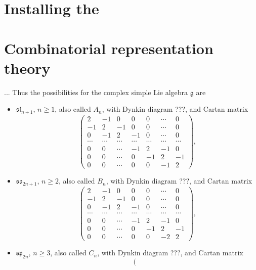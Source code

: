  


\section{Installing the \pkg}

\section{Combinatorial representation theory}
... Thus the possibilities for the complex simple Lie algebra
$\mathfrak{g}$ are
\begin{itemize}
\item $\mathfrak{sl}_{n+1}$, $n \geq 1$, also called $A_n$, with Dynkin diagram
???, and Cartan matrix $$\left(
\begin{array}{rrrrrrr}
 2 & -1 & 0 & 0 & 0 &\cdots & 0 \\
 -1 & 2 & -1 & 0 & 0 &\cdots & 0 \\
 0 & -1 & 2 & -1 & 0 & \cdots & 0 \\
 \cdots & \cdots & \cdots & \cdots & \cdots & \cdots & \cdots \\
 0 & 0& \cdots & -1 & 2 & -1 & 0 \\
 0 & 0 &\cdots & 0 & -1 & 2 & -1 \\
 0 & 0 &\cdots & 0 & 0 & -1 & 2
\end{array}
\right),$$
\item $\mathfrak{so}_{2n+1}$, $n \geq 2$, also called $B_n$, with Dynkin diagram
???, and Cartan matrix
$$\left(
\begin{array}{rrrrrrr}
 2 & -1 & 0 & 0 & 0 & \cdots & 0 \\
 -1 & 2 & -1 & 0 & 0 & \cdots & 0 \\
 0 & -1 & 2 & -1 & 0 & \cdots &0 \\
 \cdots & \cdots & \cdots & \cdots & \cdots & \cdots & \cdots \\
 0 & 0 &\cdots & -1 & 2 & -1 & 0 \\
 0 & 0 &\cdots & 0 & -1 & 2 & -1 \\
 0 & 0 &\cdots & 0 & 0 & -2 & 2
\end{array}
\right),$$
\item $\mathfrak{sp}_{2n}$, $n \geq 3$, also called $C_n$, with Dynkin diagram
???, and Cartan matrix $$\left(
\begin{array}{rrrrrrr}

\end{array}$$
\end{itemize}
